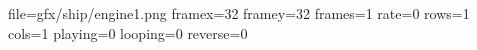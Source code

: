 file=gfx/ship/engine1.png
framex=32
framey=32
frames=1
rate=0
rows=1
cols=1
playing=0
looping=0
reverse=0
